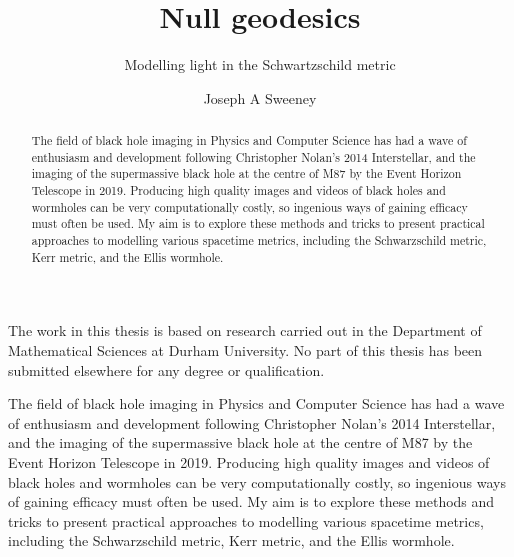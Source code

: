 \documentclass[oneside,openright,frontopenright]{dmathesis}
\begin{document}
\title{Null geodesics}
\subtitle{Modelling light in the Schwartzschild metric}
\author{Joseph A Sweeney}
\maketitlepage*

\begin{abstract}
%
	The field of black hole imaging in Physics and Computer Science has had a wave of 
	enthusiasm and development following Christopher Nolan’s 2014 Interstellar, and the 
	imaging of the supermassive black hole at the centre of M87 by the Event Horizon 
	Telescope in 2019. Producing high quality images and videos of black holes and 
	wormholes can be very computationally costly, so ingenious ways of gaining efficacy 
	must often be used. My aim is to explore these methods and tricks to present practical 
	approaches to modelling various spacetime metrics, 
	including the Schwarzschild metric, Kerr metric, and the Ellis wormhole.
%
\end{abstract}

\begin{declaration*}
%
	The work in this thesis is based on research carried out in the Department of
	Mathematical Sciences at Durham University. No part of this thesis has been
	submitted elsewhere for any degree or qualification.
%
\end{declaration*}

\disableprotrusion
\tableofcontents*
\enableprotrusion

\cleardoublepage
{}


%
%
%
%
\begin{introduction}

	The field of black hole imaging in Physics and Computer Science has had a wave of enthusiasm 
	and development following Christopher Nolan’s 2014 Interstellar, and the imaging of the supermassive 
	black hole at the centre of M87 by the Event Horizon Telescope in 2019. Producing high quality images 
	and videos of black holes and wormholes can be very computationally costly, so ingenious ways of gaining 
	efficacy must often be used. My aim is to explore these methods and tricks to present practical approaches 
	to modelling various spacetime metrics, including the Schwarzschild metric, Kerr metric, and the Ellis wormhole.

\end{introduction}

\begin{chapter1}

\end{chapter1}

\appendix
%
%

\nocite{*}
\printbibliography[heading=bibintoc]
\end{document}
